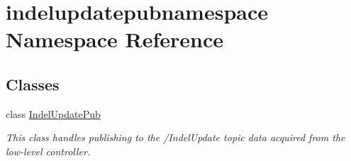\hypertarget{namespaceindelupdatepubnamespace}{}\section{indelupdatepubnamespace Namespace Reference}
\label{namespaceindelupdatepubnamespace}
\subsection*{Classes}
\begin{DoxyCompactItemize}
\item 
class \hyperlink{classindelupdatepubnamespace_1_1IndelUpdatePub}{Indel\+Update\+Pub}
\begin{DoxyCompactList}\small\item\em This class handles publishing to the /\+Indel\+Update topic data acquired from the low-\/level controller. \end{DoxyCompactList}\end{DoxyCompactItemize}
